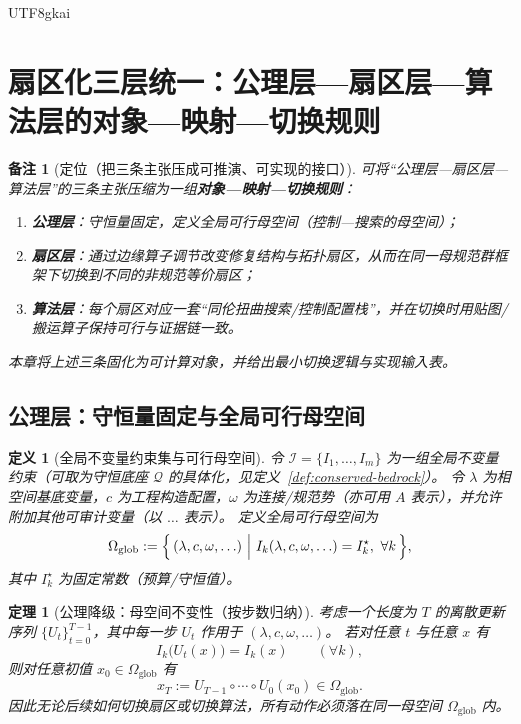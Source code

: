 \documentclass[12pt]{article}
\newtheorem{definition}{定义}[section]
\newtheorem{theorem}{定理}[section]
\newtheorem{remark}{备注}[section]
\newcommand{\Conn}{\ensuremath{\omega}}
\begin{document}
\begin{CJK*}{UTF8}{gkai}
\section{扇区化三层统一：公理层—扇区层—算法层的对象—映射—切换规则}
\label{sec:axiom-sector-algorithm-unified-framework}

\begin{remark}[定位（把三条主张压成可推演、可实现的接口）]
可将“公理层—扇区层—算法层”的三条主张压缩为一组\textbf{对象—映射—切换规则}：
\begin{enumerate}
  \item \textbf{公理层}：守恒量固定，定义全局可行母空间（控制—搜索的母空间）；
  \item \textbf{扇区层}：通过边缘算子调节改变修复结构与拓扑扇区，从而在同一母规范群框架下切换到不同的非规范等价扇区；
  \item \textbf{算法层}：每个扇区对应一套“同伦扭曲搜索/控制配置栈”，并在切换时用贴图/搬运算子保持可行与证据链一致。
\end{enumerate}
本章将上述三条固化为可计算对象，并给出最小切换逻辑与实现输入表。
\end{remark}

\subsection{公理层：守恒量固定与全局可行母空间}
\label{sec:axiom-layer-global-feasible-space}

\begin{definition}[全局不变量约束集与可行母空间]
令 $\mathcal{I}=\{I_1,\dots,I_m\}$ 为一组全局不变量约束（可取为守恒底座 $\mathcal{Q}$ 的具体化，见定义~\ref{def:conserved-bedrock}）。
令 $\lambda$ 为相空间基底变量，$c$ 为工程构造配置，$\Conn$ 为连接/规范势（亦可用 $A$ 表示），并允许附加其他可审计变量（以 $\ldots$ 表示）。
定义全局可行母空间为
\[
  \Omega_{\mathrm{glob}}
  :=
  \Bigl\{\,(\lambda,c,\Conn,\ldots)\ \Big|\ I_k(\lambda,c,\Conn,\ldots)=I_k^\star,\ \forall k\,\Bigr\},
\]
其中 $I_k^\star$ 为固定常数（预算/守恒值）。
\end{definition}

\begin{theorem}[公理降级：母空间不变性（按步数归纳）]
\label{thm:global-feasible-space-invariant}
考虑一个长度为 $T$ 的离散更新序列 $\{U_t\}_{t=0}^{T-1}$，其中每一步 $U_t$ 作用于 $(\lambda,c,\Conn,\ldots)$。
若对任意 $t$ 与任意 $x$ 有
\[
  I_k\bigl(U_t(x)\bigr)=I_k(x)\qquad(\forall k),
\]
则对任意初值 $x_0\in\Omega_{\mathrm{glob}}$ 有
\[
  x_T:=U_{T-1}\circ\cdots\circ U_0(x_0)\in\Omega_{\mathrm{glob}}.
\]
因此无论后续如何切换扇区或切换算法，所有动作必须落在同一母空间 $\Omega_{\mathrm{glob}}$ 内。
\end{theorem}


\end{CJK*}
\end{document}
